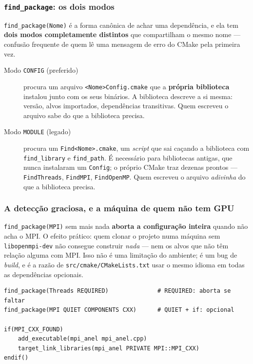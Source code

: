 \subsubsection{\texttt{find\_package}: os dois modos}

\texttt{find\_package(Nome)} é a forma canônica de achar uma dependência, e ela
tem \textbf{dois modos completamente distintos} que compartilham o mesmo nome
--- confusão frequente de quem lê uma mensagem de erro do CMake pela primeira
vez.

\begin{description}
    \item[Modo \texttt{CONFIG} (preferido)] procura um arquivo
          \texttt{<Nome>Config.cmake} que a \textbf{própria biblioteca}
          instalou junto com os seus binários. A biblioteca descreve a si mesma:
          versão, alvos importados, dependências transitivas. Quem escreveu o
          arquivo sabe do que a biblioteca precisa.
    \item[Modo \texttt{MODULE} (legado)] procura um \texttt{Find<Nome>.cmake},
          um \emph{script} que sai caçando a biblioteca com
          \texttt{find\_library} e \texttt{find\_path}. É necessário para
          bibliotecas antigas, que nunca instalaram um \texttt{Config}; o
          próprio CMake traz dezenas prontos --- \texttt{FindThreads},
          \texttt{FindMPI}, \texttt{FindOpenMP}. Quem escreveu o arquivo
          \emph{adivinha} do que a biblioteca precisa.
\end{description}

\subsubsection{A detecção graciosa, e a máquina de quem não tem GPU}

\begin{porque}
\texttt{find\_package(MPI)} sem mais nada \textbf{aborta a configuração inteira}
quando não acha o MPI. O efeito prático: quem clonar o projeto numa máquina sem
\texttt{libopenmpi-dev} não consegue construir \emph{nada} --- nem os alvos que
não têm relação alguma com MPI. Isso não é uma limitação do ambiente; é um bug
de \emph{build}, e é a razão de \texttt{src/cmake/CMakeLists.txt} usar o mesmo
idioma em todas as dependências opcionais.
\end{porque}

\begin{lstlisting}[style=bt, language=Meson,
    morekeywords={find_package,add_executable,target_link_libraries,QUIET,
                  REQUIRED,COMPONENTS,PRIVATE,include,check_language,
                  enable_language,set,if,endif},
    caption={O idioma da dependência opcional, em \texttt{src/cmake/CMakeLists.txt},
             seção 3.}]
find_package(Threads REQUIRED)              # REQUIRED: aborta se faltar
find_package(MPI QUIET COMPONENTS CXX)      # QUIET + if: opcional

if(MPI_CXX_FOUND)
    add_executable(mpi_anel mpi_anel.cpp)
    target_link_libraries(mpi_anel PRIVATE MPI::MPI_CXX)
endif()
\end{lstlisting}

